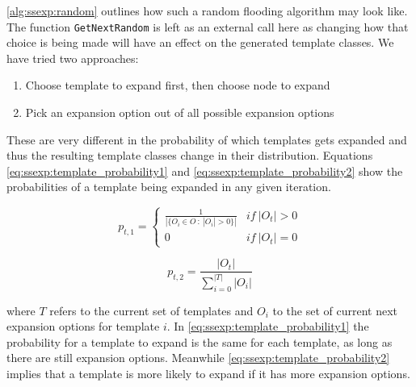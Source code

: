 \autoref{alg:ssexp:random} outlines how such a random flooding algorithm may look like. The function \texttt{GetNextRandom}
is left as an external call here as changing how that choice is being made will have an effect on the generated template classes.
We have tried two approaches:

\begin{enumerate}
    \item Choose template to expand first, then choose node to expand
    \item Pick an expansion option out of all possible expansion options
\end{enumerate}

These are very different in the probability of which templates gets expanded
and thus the resulting template classes change in their distribution. Equations
\autoref{eq:ssexp:template_probability1} and \autoref{eq:ssexp:template_probability2}
show the probabilities of a template being expanded in any given iteration.

\begin{equation}
    p_{t, 1} = 
    \begin{cases}
        \frac{1}{|\{O_i \in O \ : \ |O_i| > 0\}|} & if \ |O_t| > 0\\
        0 & if \ |O_t| = 0
    \end{cases}
    \label{eq:ssexp:template_probability1}
\end{equation}

\begin{equation}
    p_{t, 2} = \frac{|O_t|}{\sum_{i=0}^{|T|} |O_i|}
    \label{eq:ssexp:template_probability2}
\end{equation}

where $T$ refers to the current set of templates and $O_i$ to the set
of current next expansion options for template $i$. In \autoref{eq:ssexp:template_probability1}
the probability for a template to expand is the same for each template, as long as there
are still expansion options. Meanwhile \autoref{eq:ssexp:template_probability2} implies that
a template is more likely to expand if it has more expansion options.\\
\\

